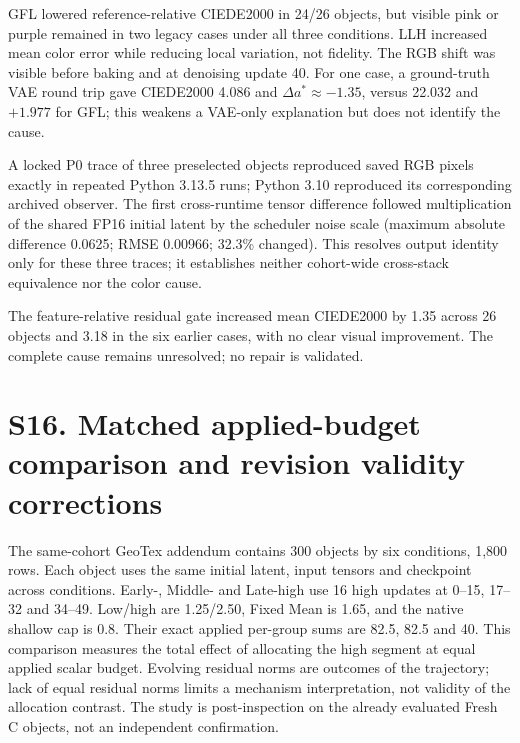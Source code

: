 \documentclass[11pt]{article}
\begin{document}
GFL lowered reference-relative CIEDE2000 in 24/26 objects, but visible pink or purple remained in two legacy cases under all three conditions. LLH increased mean color error while reducing local variation, not fidelity. The RGB shift was visible before baking and at denoising update 40. For one case, a ground-truth VAE round trip gave CIEDE2000 4.086 and $\Delta a^*\approx-1.35$, versus 22.032 and $+1.977$ for GFL; this weakens a VAE-only explanation but does not identify the cause.

A locked P0 trace of three preselected objects reproduced saved RGB pixels exactly in repeated Python 3.13.5 runs; Python 3.10 reproduced its corresponding archived observer. The first cross-runtime tensor difference followed multiplication of the shared FP16 initial latent by the scheduler noise scale (maximum absolute difference 0.0625; RMSE 0.00966; 32.3\% changed). This resolves output identity only for these three traces; it establishes neither cohort-wide cross-stack equivalence nor the color cause.

The feature-relative residual gate increased mean CIEDE2000 by 1.35 across 26 objects and 3.18 in the six earlier cases, with no clear visual improvement. The complete cause remains unresolved; no repair is validated.

\section*{S16. Matched applied-budget comparison and revision validity corrections}
The same-cohort GeoTex addendum contains 300 objects by six conditions, 1,800 rows. Each object uses the same initial latent, input tensors and checkpoint across conditions. Early-, Middle- and Late-high use 16 high updates at 0--15, 17--32 and 34--49. Low/high are 1.25/2.50, Fixed Mean is 1.65, and the native shallow cap is 0.8. Their exact applied per-group sums are 82.5, 82.5 and 40. This comparison measures the total effect of allocating the high segment at equal applied scalar budget. Evolving residual norms are outcomes of the trajectory; lack of equal residual norms limits a mechanism interpretation, not validity of the allocation contrast. The study is post-inspection on the already evaluated Fresh C objects, not an independent confirmation.
\end{document}
